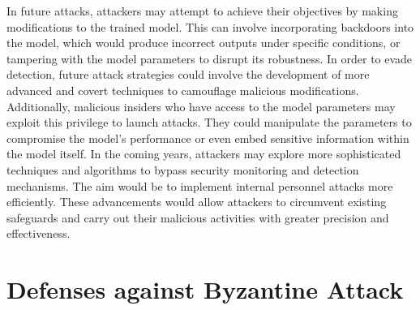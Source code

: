 \documentclass[conference]{IEEEtran}
\begin{document}
In future attacks, attackers may attempt to achieve their objectives by making modifications to the trained model. This can involve incorporating backdoors into the model, which would produce incorrect outputs under specific conditions, or tampering with the model parameters to disrupt its robustness.
In order to evade detection, future attack strategies could involve the development of more advanced and covert techniques to camouflage malicious modifications. Additionally, malicious insiders who have access to the model parameters may exploit this privilege to launch attacks. They could manipulate the parameters to compromise the model's performance or even embed sensitive information within the model itself.
In the coming years, attackers may explore more sophisticated techniques and algorithms to bypass security monitoring and detection mechanisms. The aim would be to implement internal personnel attacks more efficiently. These advancements would allow attackers to circumvent existing safeguards and carry out their malicious activities with greater precision and effectiveness.



\section{Defenses against Byzantine Attack}
\end{document}
